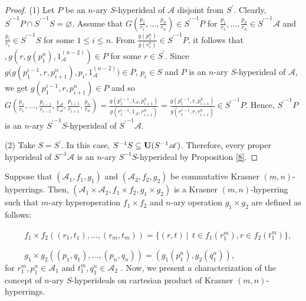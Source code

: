 \documentclass[preprint,review,10pt]{amsart}
\theoremstyle{definition}
\theoremstyle{remark}
\numberwithin{equation}{section}
\begin{document}
\begin{proof}
(1) Let $P$ be an $n$-ary $S$-hyperideal of $\mathscr{A}$ disjoint from  $S^{\prime}$. Clearly,  ${S^{\prime}}^{-1} P \cap {S^{\prime}}^{-1} S=\varnothing$. Assume that $G(\frac{p_1}{r_1},\ldots,\frac{p_n}{r_n}) \in {S^{\prime}}^{-1} P$ for $\frac{p_1}{r_1},\ldots,\frac{p_n}{r_n} \in {S^{\prime}}^{-1} \mathscr{A}$ and $\frac{p_i}{r_i} \in {S^{\prime}}^{-1} S$ for some $1 \leq i \leq n$. From $\frac{g(p_1^n)}{g(r_1^n)} \in {S^{\prime}}^{-1} P$, it follows that $,g(r,g(p_1^n),1_\mathscr{A}^{(n-2)}) \in P$ for some $r \in S^{\prime}$. Since $g \big(g(p_1^{i-1},r,p_{i+1}^n) ,p_i,1_\mathscr{A}^{(n-2)}\big) \in P$, $p_i \in S$ and $P$ is an $n$-ary $S$-hyperideal of $\mathscr{A}$,  we get $g(p_1^{i-1},r,p_{i+1}^n) \in P$ and so 
$G(\frac{p_1}{r_1},\ldots,\frac{p_{i-1}}{r_{i-1}}, \frac{1_\mathscr{A}}{1_\mathscr{A}}, \frac{p_{i+1}}{r_{i+1}},\frac{p_n}{r_n})=\frac{g(p_1^{i-1},1_\mathscr{A},p_{i+1}^n)}{g(r_1^{i-1},1_\mathscr{A},r_{i+1}^n)}=\frac{g(p_1^{i-1},r,p_{i+1}^n) }{g(r_1^{i-1},r,r_{i+1}^n)} \in {S^{\prime}}^{-1} P$. Hence, ${S^{\prime}}^{-1} P$ is an $n$-ary ${S^{\prime}}^{-1} S$-hyperideal of ${S^{\prime}}^{-1} \mathscr{A}$.

(2) Take $S=S^{\prime}$. In this case, $S^{-1}S \subseteq {\bf U}(S^{-1}\mathscr{A})$. Therefore, every  proper hyperideal of $S^{-1} \mathscr{A}$ is an $n$-ary $S^{-1} S$-hyperideal by Proposition \ref{8}.
\end{proof}

Suppose that  $(\mathscr{A}_1, f_1, g_1)$ and $(\mathscr{A}_2, f_2, g_2)$ be  commutative Krasner $(m,n)$-hyperrings. Then, $(\mathscr{A}_1 \times \mathscr{A}_2, f _1 \times f_2 ,g_1 \times g_2 )$ is a Krasner $(m, n)$-hyperring such that  $m$-ary hyperoperation $f _1 \times f_2 $ and $n$-ary operation $g_1 \times g_2$ are defined as follows:


$\hspace{1cm} f_1 \times f_2((r_{1}, t_{1}),\ldots,(r_m,t_m)) = \{(r,t) \ \vert \ \ t \in f_1(r_1^m), r \in f_2(t_1^m) \},$


$\hspace{1cm} g_1 \times g_2 ((p_1,q_1),\ldots,(p_n,q_n)) =(g_1(p_1^n),g_2(q_1^n)) $,\\
for $r_1^m,p_1^n \in \mathscr{A}_1$ and $t_1^m,q_1^n \in \mathscr{A}_2$ \cite{mah2}. Now, we present a characterization  of the concept of  $n$-ary $S$-hyperideals on cartesian product of Krasner $(m, n)$-hyperrings. 
\end{document}
